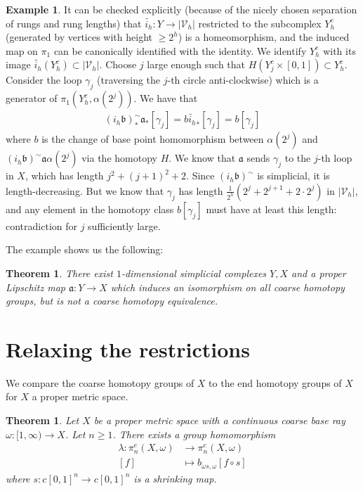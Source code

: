 \documentclass[a4paper,11pt]{article}
\theoremstyle{definition}
\newtheorem{example}[definition]{Example}
\theoremstyle{plain}
\newtheorem{theorem}[definition]{Theorem}
\theoremstyle{remark}
\begin{document}
{\begin{example}
It can be checked explicitly (because of the nicely chosen separation of rungs and rung lengths) that $ \widetilde{i_{h}}: Y\rightarrow |\mathcal{V}_{h}|$ restricted to the subcomplex $Y^c_{h}$ (generated by vertices with height $\geq 2^h$) is a homeomorphism, and the induced map on $\pi_1$ can be canonically identified with the identity. We identify $Y^c_{h}$ with its image $\widetilde{i_{h}}(Y^c_{h})\subset |\mathcal{V}_{h}|$. Choose $j$ large enough such that $H(Y^c_{j}\times [0,1])\subset Y^c_{h}$. Consider the loop $\gamma_{j}$ (traversing the $j$-th circle anti-clockwise) which is a generator of $\pi_1(Y^c_{h},\alpha(2^{j}))$. We have that 
\begin{align*}
(i_{h}\mathfrak{b})^{\sim}_{\ast} \mathfrak{a}_{\ast}[\gamma_{j}] = b\widetilde{i_{h}}_{\ast}[\gamma_{j}] = b[\gamma_{j}]
\end{align*}
where $b$ is the change of base point homomorphism between $\alpha(2^{j})$ and $(i_{h}\mathfrak{b})^{\sim} \mathfrak{a}\alpha(2^{j})$ via the homotopy $H$. We know that $\mathfrak{a}$ sends $\gamma_{j}$ to the $j$-th loop in $X$, which has length $j^2+(j+1)^2+2$. Since $(i_{h}\mathfrak{b})^{\sim}$ is simplicial, it is length-decreasing. But we know that $\gamma_{j}$ has length  $\frac{1}{2^h}(2^j+2^{j+1}+2\cdot 2^j)$ in $|\mathcal{V}_{h}|$, and any element in the homotopy class $ b[\gamma_{j}]$ must have at least this length: contradiction for $j$ sufficiently large.
\end{example}

The example shows us the following:

\begin{theorem} \label{fail} There exist $1$-dimensional simplicial complexes $Y,X$ and a proper Lipschitz map $\mathfrak{a}: Y\rightarrow X$ which induces an isomorphism on all coarse homotopy groups, but is not a coarse homotopy equivalence. 
\end{theorem}


\newpage

\section{Relaxing the restrictions}

We compare the coarse homotopy groups of $X$ to the end homotopy groups of $X$ for $X$ a proper metric space. 

\begin{theorem} \label{endcoarse} Let $X$ be a proper metric space with a continuous coarse base ray $\omega: [1,\infty)\rightarrow X$. Let $n\geq 1$. There exists a group homomorphism 
\begin{align*}
\lambda: \pi_{n}^{e}(X,\omega)&\rightarrow \pi_{n}^{c}(X,\omega)\\
[f] &\mapsto b_{\omega s,\omega} [f\circ s]
\end{align*}
where $s: c[0,1]^n \rightarrow c[0,1]^n$ is a shrinking map.  
\end{theorem}

}
\end{document}
